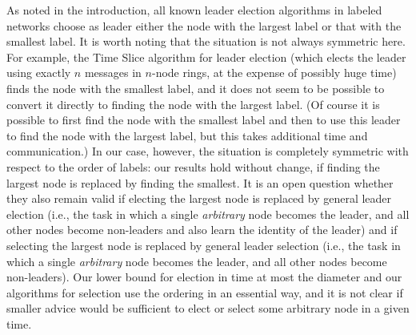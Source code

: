 \documentclass[11pt]{article}
\begin{document}
As noted in the introduction, all known leader election algorithms in labeled networks choose as leader either the node with the largest label or that with 
the smallest label. It is worth noting that the situation is not always symmetric here. For example, the Time Slice algorithm for leader election \cite{Ly} (which elects the
leader using exactly $n$ messages in $n$-node rings, at the expense of possibly huge time) finds the node
with the smallest label, and it does not seem to be possible to convert it directly to finding the node with the largest label. (Of course it is possible to first
find the node with the smallest label and then to use this leader to find the node with the largest label, but this takes additional time and communication.)
In our case, however, the situation is completely symmetric with respect to the order of labels: our results hold without change, if finding the largest node is replaced by finding the smallest. It is an open question whether they also remain valid if electing the largest node is replaced by general leader election (i.e., the task
in which a single {\em arbitrary} node becomes the leader, and all other nodes become non-leaders and also learn the identity of the leader) and if selecting the largest
node is replaced by general  leader selection  (i.e., the task
in which a single {\em arbitrary} node becomes the leader, and all other nodes become non-leaders). 
Our lower bound for election in time at most the diameter and our algorithms for selection use the ordering in an essential way, and it is not clear if smaller advice would be sufficient to elect or select some arbitrary node in a given time.


\pagebreak
\end{document}
